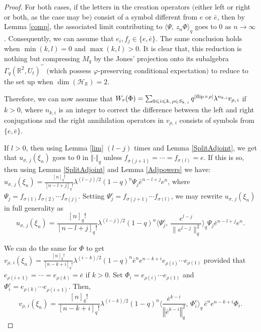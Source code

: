 \documentclass[12pt, a4paper,reqno]{amsart}
\theoremstyle{definition}
\renewcommand{\leq}{\leqslant}
\def\R{\mathbb R}
\newcommand{\CH}{\mathcal{H}}
\newcommand{\norm}[1]{\left\Vert#1\right\Vert}
\begin{document}
\begin{proof}
For both cases, if the letters in the creation operators $($either left or right or both, as the case may be$)$ consist of a symbol different from $e$ or $\bar e$, then by Lemma \ref{comp}, the associated limit contributing to $\langle  \Psi ,\,z_n \Phi\rangle_q$ goes to $0$ as $n\rightarrow \infty$. Consequently, we can assume that $e_i, f_j\in \{e,\bar e\}$. 
The same conclusion holds when $\min(k,l)=0$ and $\max(k,l)>0$. It is clear that, this reduction is nothing but compressing $M_q$ by the Jones' projection onto its subalgebra $\Gamma_q(\R^2, U_t)^{\prime\prime}$ $($which possess $\varphi$-preserving conditional expectation$)$ to reduce to the set up when $\dim(\CH_\R)=2$.

Therefore, we can now assume that $W_r(\Phi)=\sum_{ 0\leq i\leq k,\, \rho\in S_{k,\,i}} q^{|{\rm flip}\,\circ\,\rho|}\lambda^{n_{k,i}}v_{\rho,\,i}$ if $k>0$, where $n_{k,i}$ is an integer to correct the difference between the left and right conjugations and the right annihilation operators in $v_{\rho,\,i}$ consists of symbols from $\{e,\bar e\}$.     

If $l>0$, then using Lemma \ref{lim} $(l-j)$ times and Lemma \ref{SplitAdjoint}, we get that $u_{\sigma,\,j}(\xi_n)$ goes to $0$ in $\norm{\cdot}_q$ unless $f_{\sigma(j+1)}=\cdots=f_{\sigma(l)}=e$. If this is so, then using Lemma \ref{SplitAdjoint} and Lemma \ref{Adjpowers} we have: $u_{\sigma,\,j}(\xi_n)=\frac{[n]_q!}{[n-l+j]_q!}\lambda^{(l-j)/2}(1-q)^{n}\Psi_j\bar{e}^{n-l+j}e^n$, where $\Psi_j=f_{\sigma(1)}f_{\sigma(2)}\cdots f_{\sigma(j)}$. Setting $\Psi^c_j=f_{\sigma(j+1)}\cdots f_{\sigma(l)}$, we may rewrite $u_{\sigma,\,j}(\xi_n)$ in full generality as 
$$u_{\sigma,\,j}(\xi_n)=  \frac{[n]_q!}{[n-l+j]_q!}\lambda^{(l-j)/2}(1-q)^{n}
\langle \Psi_j^c,\,\frac {e^{l-j}}{\|{e}^{l-j}\|_q^2} \rangle_q\Psi_j \bar{e}^{n-l+j}e^n.$$

We can do the same for $\Phi$ to get $v_{\rho,\,i}(\xi_n)=\frac{[n]_q!}{[n-k+i]_q!}\lambda^{(i-k)/2}(1-q)^{n}\bar{e}^{n}e^{n-k+i} e_{\rho(i)}\cdots e_{\rho(1)}$  provided that $e_{\rho(i+1)}=\cdots=e_{\rho(k)}=\bar e$ if $k>0$. Set $\Phi_i= e_{\rho(i)}\cdots e_{\rho(1)}$ and $\Phi_i^c= e_{\rho(k)}\cdots e_{\rho(i+1)}$. Then,
$$v_{\rho,\,i}(\xi_n)=  \frac{[n]_q!}{[n-k+i]_q!}\lambda^{(i-k)/2}(1-q)^{n}\langle \frac{\bar{e}^{k-i}}{\norm{\bar{e}^{k-i}}_q^2},\,\Phi_i^c\rangle_q\,
\bar{e}^{n}e^{n-k+i}\Phi_i.$$	 


\end{proof}
\end{document}
